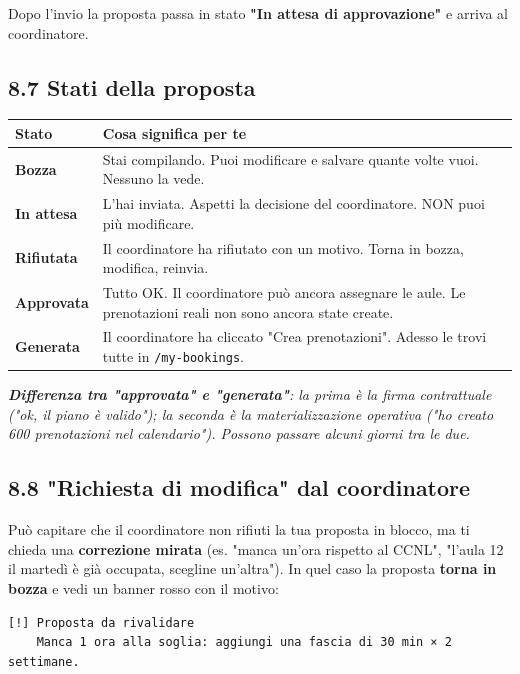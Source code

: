 \documentclass[11pt,a4paper]{article}
\renewenvironment{quote}
  {\begin{list}{}{%
      \setlength{\leftmargin}{8pt}%
      \setlength{\rightmargin}{8pt}%
      \setlength{\topsep}{6pt}%
      \setlength{\parsep}{0pt}}%
      \item\relax\color{black!75}\itshape}
  {\end{list}}
\begin{document}
Dopo l'invio la proposta passa in stato \textbf{"In attesa di approvazione"} e arriva al coordinatore.

\subsection{8.7 Stati della proposta}


\begin{table}[H]
\centering
\small
\begin{tabularx}{\linewidth}{|X|X|}
\hline
\rowcolor{tableheader} Stato & Cosa significa per te \\
\hline
\textbf{Bozza} & Stai compilando. Puoi modificare e salvare quante volte vuoi. Nessuno la vede. \\
\hline
\textbf{In attesa} & L'hai inviata. Aspetti la decisione del coordinatore. NON puoi più modificare. \\
\hline
\textbf{Rifiutata} & Il coordinatore ha rifiutato con un motivo. Torna in bozza, modifica, reinvia. \\
\hline
\textbf{Approvata} & Tutto OK. Il coordinatore può ancora assegnare le aule. Le prenotazioni reali non sono ancora state create. \\
\hline
\textbf{Generata} & Il coordinatore ha cliccato "Crea prenotazioni". Adesso le trovi tutte in \texttt{/my-bookings}. \\
\hline
\end{tabularx}
\end{table}


\begin{quote}
\textbf{Differenza tra "approvata" e "generata"}: la prima è la firma contrattuale ("ok, il piano è valido"); la seconda è la materializzazione operativa ("ho creato 600 prenotazioni nel calendario"). Possono passare alcuni giorni tra le due.
\end{quote}

\subsection{8.8 "Richiesta di modifica" dal coordinatore}


Può capitare che il coordinatore non rifiuti la tua proposta in blocco, ma ti chieda una \textbf{correzione mirata} (es. "manca un'ora rispetto al CCNL", "l'aula 12 il martedì è già occupata, scegline un'altra"). In quel caso la proposta \textbf{torna in bozza} e vedi un banner rosso con il motivo:

\begin{lstlisting}
[!] Proposta da rivalidare
    Manca 1 ora alla soglia: aggiungi una fascia di 30 min × 2 settimane.
\end{lstlisting}
\end{document}
